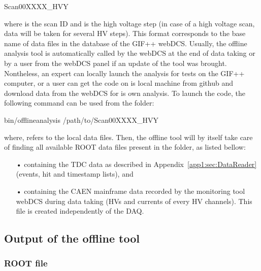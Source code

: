 	\begin{bashcode}
 Scan00XXXX_HVY
	\end{bashcode}
\vspace{5mm}
	where  is the scan ID and  is the high voltage step (in case of a high voltage scan, data will be taken for several HV steps). This format corresponds to the base name of data files in the database of the GIF++ webDCS. Usually, the offline analysis tool is automatically called by the webDCS at the end of data taking or by a user from the webDCS panel if an update of the tool was brought. Nontheless, an expert can locally launch the analysis for tests on the GIF++ computer, or a user can get the code on is local machine from github and download data from the webDCS for is own analysis. To launch the code, the following command can be used from the  folder:\\
	
	\begin{bashcode}
 bin/offlineanalysis /path/to/Scan00XXXX_HVY
	\end{bashcode}
\vspace{5mm}
	where,  refers to the local data files. Then, the offline tool will by itself take care of finding all available ROOT data files present in the folder, as listed bellow:

	\begin{itemize}
		\item[•]  containing the TDC data as described in Appendix~\ref{app1:sec:DataReader} (events, hit and timestamp lists), and
		\item[•]  containing the CAEN mainframe data recorded by the monitoring tool webDCS during data taking (HVs and currents of every HV channels). This file is created independently of the DAQ.
	\end{itemize}
	
	\subsection{Output of the offline tool}
	\label{app2:ssec:output}
	
		\subsubsection{ROOT file}
		\label{app2:sssec:ROOT}
	
